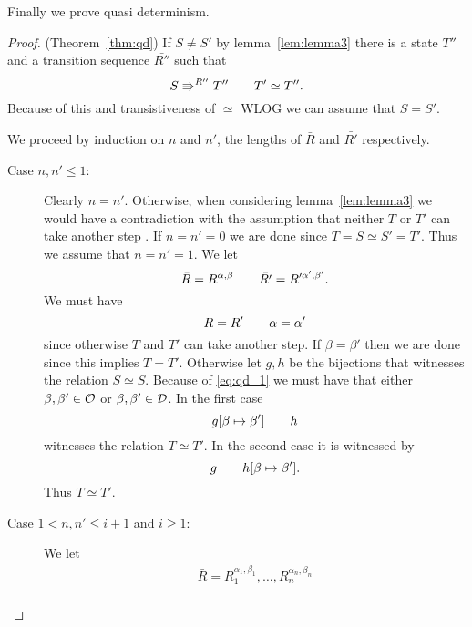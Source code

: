 Finally we prove quasi determinism.
\begin{proof}{(Theorem~\ref{thm:qd})}
  If $S \neq S'$ by lemma~\ref{lem:lemma3} there is a state $T''$ and a
  transition sequence $\bar{R''}$ such that
  \begin{equation}
    S \Rrightarrow^{\bar{R''}} T'' \quad\quad T' \simeq T''.
  \end{equation}
  Because of this and transistiveness of $\simeq$ WLOG we can assume that $S =
  S'$.

  We proceed by induction on $n$ and $n'$, the lengths of $\bar{R}$ and
  $\bar{R'}$ respectively.
  \begin{description}
    \item[Case $n, n' \leq 1$:] Clearly $n = n'$. Otherwise, when considering
      lemma~\ref{lem:lemma3} we would have a contradiction with the assumption
      that neither $T$ or $T'$ can take another step .
      If $n = n' = 0$ we are done since $T = S \simeq S' = T'$. Thus we assume
      that $n = n' = 1$. We let
      \begin{equation*}
        \bar{R} = R^{\alpha, \beta} \quad\quad \bar{R'} = R'^{\alpha', \beta'}.
      \end{equation*}
      We must have 
      \begin{equation} \label{eq:qd_1}
        R = R' \quad\quad \alpha = \alpha'
      \end{equation} 
      since otherwise $T$ and $T'$ can take another step.  If $\beta = \beta'$
      then we are done since this implies $T = T'$.  Otherwise let $g, h$ be the
      bijections that witnesses the relation $S \simeq S$. Because of
      \eqref{eq:qd_1} we must have that either $\beta, \beta' \in \mathcal{O}$ or
      $\beta, \beta' \in \mathcal{D}$. In the first case 
      \begin{equation}
        g[\beta \mapsto \beta'] \quad\quad h
      \end{equation}
      witnesses the relation $T \simeq T'$. In the second case it is witnessed
      by
      \begin{equation*}
        g \quad\quad h[\beta \mapsto \beta'].
      \end{equation*}
      Thus $T \simeq T'$.
    \item[Case $1 < n, n' \leq i+1$ and $i \geq 1$:] We let 
      \begin{equation*}
        \begin{gathered}
          \bar{R} = R_1^{\alpha_1, \beta_1}, \dots, R_n^{\alpha_n, \beta_n} \\

\end{gathered}
\end{equation*}
\end{description}
\end{proof}
